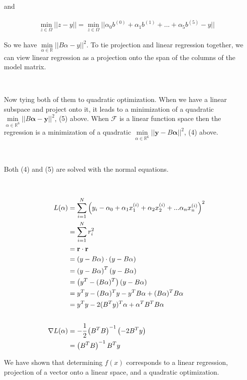 \documentclass[]{article}
\begin{document}
and

\begin{align} \min_{z \in \Omega} ||z-y|| = \min_{z \in \Omega} ||\alpha_0 b^{(0)} + \alpha_1 b^{(1)} + ... + \alpha_5 b^{(5)}-y|| \end{align}

So we have \(\min\limits_{\alpha \in \mathbb{R}} ||B \alpha - y||^2\).
To tie projection and linear regression together, we can view linear
regression as a projection onto the span of the columns of the model
matrix.

~

Now tying both of them to quadratic optimization. When we have a linear
subspace and project onto it, it leads to a minimization of a quadratic
\(\min\limits_{\alpha \in \mathbb{R}^6} ||B{\bm \alpha}-{\bm y}||^2\),
(5) above. When \(\mathcal{F}\) is a linear function space then the
regression is a minimization of a quadratic
\(\min\limits_{\alpha \in \mathbb{R}^6 } ||{\bm y}-B{\bm \alpha}||^2\),
(4) above.

~

Both (4) and (5) are solved with the normal equations.

~

\begin{align*}
L(\alpha) &= \sum_{i=1}^N \left(   y_i - \alpha_0 + \alpha_1x_1^{(i)} + \alpha_2x_2^{(i)} + ... \alpha_nx_n^{(i)}  \right)^2 \\
&= \sum_{i=1}^N r_i^2 \\
&= {\bf r}\cdot{\bf r} \\
&=\left(y-B \alpha \right) \cdot \left(y-B \alpha\right) \\
&=\left(y-B \alpha\right)^T \left(y-B \alpha\right) \\
&= \left(y^T- (B \alpha)^T \right) \left(y-B \alpha\right) \\
&=y^Ty - (B\alpha)^Ty-y^TB\alpha + (B \alpha)^T B \alpha \\
&= y^Ty - 2(B^T y )^T  \alpha +\alpha^T B^T B \alpha \\
\\
\nabla L(\alpha) &= -\cfrac{1}{2} \left(B^T B \right)^{-1} \left(-2B^T y \right) \\
&= \left( B^T B \right)^{-1} B^T y
\end{align*}

We have shown that determining \(f(x)\) corresponds to a linear
regression, projection of a vector onto a linear space, and a quadratic
optimization.

\newpage
\end{document}
